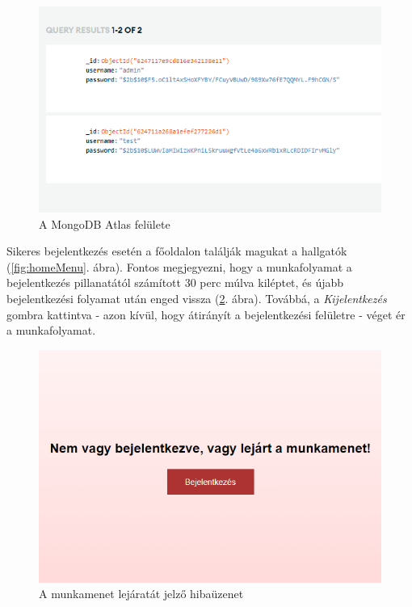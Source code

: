 \begin{figure}[h]
	\centering
		\includegraphics[width=12truecm, height=7truecm]{images/atlas.png}
	\caption{A MongoDB Atlas felülete}
	\label{fig:atlas}
\end{figure}

Sikeres bejelentkezés esetén a főoldalon találják magukat a hallgatók (\ref{fig:homeMenu}. ábra). Fontos megjegyezni, hogy a munkafolyamat a bejelentkezés pillanatától számított 30 perc múlva kiléptet, és újabb bejelentkezési folyamat után enged vissza (\ref{fig:invalid}. ábra). Továbbá, a \textit{Kijelentkezés} gombra kattintva - azon kívül, hogy átirányít a bejelentkezési felületre - véget ér a munkafolyamat.

\begin{figure}[h]
	\centering
		\includegraphics[width=10truecm, height=7truecm]{images/lejart_munkamenet.png}
	\caption{A munkamenet lejáratát jelző hibaüzenet}
	\label{fig:invalid}
\end{figure}

